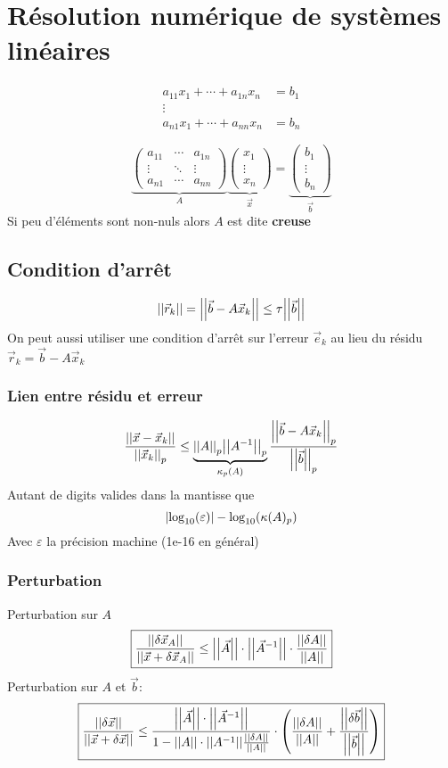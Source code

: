 \documentclass[resume]{subfiles}
\begin{document}
    \section{Résolution numérique de systèmes linéaires}
    \begin{align*}
    a_{11}x_1+\cdots+a_{1n}x_n &=b_1\\
    \vdots \\
    a_{n1}x_1 + \cdots + a_{nn}x_n &= b_n
    \end{align*}
    
    $$\underbrace{\begin{pmatrix}
    a_{11} & \cdots & a_{1n}\\
    \vdots & \ddots & \vdots\\
    a_{n1} & \cdots & a_{nn}
    \end{pmatrix}}_{A}\underbrace{\begin{pmatrix}
    x_1\\\vdots\\x_n
    \end{pmatrix}}_{\vec{x}}=\underbrace{\begin{pmatrix}
    b_1\\\vdots\\b_n
    \end{pmatrix}}_{\vec{b}}$$
	Si peu d'éléments sont non-nuls alors $A$ est dite \textbf{creuse}
	\subsection{Condition d'arrêt}
	$$\abs{\abs{\vec{r}_k}}=\abs{\abs{\vec{b}-A\vec{x}_k}}\leq \tau\abs{\abs{\vec{b}}}$$
	On peut aussi utiliser une condition d'arrêt sur l'erreur $\vec{e}_k$ au lieu du résidu $\vec{r}_k=\vec{b}-A\vec{x}_k$
	\subsubsection{Lien entre résidu et erreur}
	$$\frac{\abs{\abs{\vec{x}-\vec{x}_k}}}{\abs{\abs{\vec{x}_k}}_p}\leq \underbrace{\abs{\abs{A}}_p\abs{\abs{A^{-1}}}_p}_{\kappa_p(A)}\frac{\abs{\abs{\vec{b}-A\vec{x}_k}}_p}{\abs{\abs{\vec{b}}}_p}$$
	Autant de digits valides dans la mantisse que
	$$\abs{\log_{10}(\varepsilon)}-\log_{10}(\kappa(A)_p)$$
	Avec $\varepsilon$ la précision machine (1e-16 en général)
	\subsubsection{Perturbation}
	Perturbation sur $A$
	$$\boxed{\frac{\abs{\abs{\delta\vec{x}_A}}}{\abs{\abs{\vec{x}+\delta \vec{x}_A}}}\leq \abs{\abs{\vec{A}}}\cdot\abs{\abs{\vec{A}^{-1}}}\cdot\frac{\abs{\abs{\delta A}}}{\abs{\abs{A}}}}$$
	Perturbation sur $A$ et $\vec{b}$:
	$$\boxed{\frac{\abs{\abs{\delta\vec{x}}}}{\abs{\abs{\vec{x}+\delta \vec{x}}}}\leq \frac{\abs{\abs{\vec{A}}}\cdot\abs{\abs{\vec{A}^{-1}}}}{1-\abs{\abs{A}}\cdot \abs{\abs{A^{-1}}}\frac{\abs{\abs{\delta A}}}{\abs{\abs{A}}}}\cdot\left(\frac{\abs{\abs{\delta A}}}{\abs{\abs{A}}}+\frac{\abs{\abs{\delta \vec{b}}}}{\abs{\abs{\vec{b}}}}\right)}$$
\end{document}
